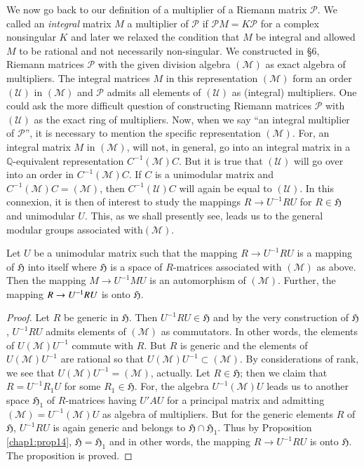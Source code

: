 We now go back to our definition of a multiplier of a Riemann matrix
$\mathscr{P}$. We called an {\em integral} matrix $M$ a multiplier of
$\mathscr{P}$ if $\mathscr{P}M=K\mathscr{P}$ for a complex nonsingular
$K$ and later we relaxed the condition that $M$ be integral and
allowed $M$ to be rational and not necessarily non-singular. We
constructed in \S 6, Riemann matrices $\mathscr{P}$
with the given division algebra $(\mathscr{M})$ as exact algebra of
multipliers. The integral matrices $M$ in this representation
$(\mathscr{M})$ form an order $(\mathscr{U})$ in $(\mathscr{M})$ and
$\mathscr{P}$ admits all elements of $(\mathscr{U})$ as (integral)
multipliers. One could ask the more difficult question of constructing
Riemann matrices $\mathscr{P}$ with $(\mathscr{U})$ as the exact ring
of multipliers. Now, when we say ``an integral multiplier of
$\mathscr{P}$'', it is necessary to mention the specific
representation $(\mathscr{M})$. For, an integral matrix $M$ in
$(\mathscr{M})$, will not, in general, go into an integral matrix in a
$\mathbb{Q}$-equivalent representation $C^{-1}(\mathscr{M})C$. But it
is true that $(\mathscr{U})$ will go over into an order in
$C^{-1}(\mathscr{M})C$. If $C$ is a unimodular matrix and
$C^{-1}(\mathscr{M})C=(\mathscr{M})$, then $C^{-1}(\mathscr{U})C$ will
again be equal to $(\mathscr{U})$. In this connexion, it is then of
interest to study the mappings $R\to U^{-1}RU$ for $R\in\mathfrak{H}$
and unimodular $U$. This, as we shall presently see, leads us to the
general modular groups associated with\pageoriginale $(\mathscr{M})$.

\begin{proposition}\label{prop17}
Let $U$ be a unimodular matrix such that the mapping $R\to U^{-1}RU$
is a mapping of $\mathfrak{H}$ into itself where $\mathfrak{H}$ is a
space of $R$-matrices associated with $(\mathscr{M})$ as above. Then
the mapping $M\to U^{-1}MU$ is an automorphism of
$(\mathscr{M})$. Further, the mapping $R\to U^{-1}\break RU$ is onto
$\mathfrak{H}$. 
\end{proposition}

\begin{proof}
Let $R$ be generic in $\mathfrak{H}$. Then $U^{-1}RU\in\mathfrak{H}$
and by the very construction of $\mathfrak{H}$, $U^{-1}RU$ admits
elements of $(\mathscr{M})$ as commutators. In other words, the
elements of $U(\mathscr{M})U^{-1}$ commute with $R$. But $R$ is
generic and the elements of $U(\mathscr{M})U^{-1}$ are rational so
that $U(\mathscr{M})U^{-1}\subset (\mathscr{M})$. By considerations of
rank, we see that $U(\mathscr{M})U^{-1}=(\mathscr{M})$, actually. Let
$R\in\mathfrak{H}$; then we claim that $R=U^{-1}R_{1}U$ for some
$R_{1}\in\mathfrak{H}$. For, the algebra $U^{-1}(\mathscr{M})U$ leads
us to another space $\mathfrak{H}_{1}$ of $R$-matrices having $U'AU$
for a principal matrix and admitting
$(\mathscr{M})=U^{-1}(\mathscr{M})U$ as algebra of multipliers. But
for the generic elements $R$ of $\mathfrak{H}$, $U^{-1}RU$ is again
generic and belongs to $\mathfrak{H}\cap \mathfrak{H}_{1}$. Thus by
Proposition \ref{chap1:prop14}, $\mathfrak{H}=\mathfrak{H}_{1}$ and in other
words, the mapping $R\to U^{-1}RU$ is onto $\mathfrak{H}$. The
proposition is proved.
\end{proof}

